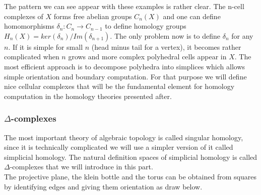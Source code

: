 \documentclass[12pt, a4paper]{article}
\begin{document}
The pattern we can see appear with these examples is rather clear. The n-cell complexes of $X$ forms free abelian groups $C_n(X)$ and one can define homomorphisms $\delta_n: C_n \to C_{n-1}$ to define homology groups $H_n(X) = ker(\delta_n)/Im(\delta_{n+1})$. The only problem now is to define $\delta_n$ for any $n$. If it is simple for small $n$ (head minus tail for a vertex), it becomes rather complicated when $n$ grows and more complex polyhedral cells appear in $X$. The most efficient approach is to decompose polyhedra into simplices which allows simple orientation and boundary computation. For that purpose we will define nice cellular complexes that will be the fundamental element for homology computation in the homology theories presented after. 

\subsubsection{$\Delta$-complexes}
\label{sec:delta_complexes}

The most important theory of algebraic topology is called singular homology, since it is technically complicated we will use a simpler version of it called simplicial homology. The natural definition spaces of simplicial homology is called $\Delta$-complexes that we will introduce in this part.\\

The projective plane, the klein bottle and the torus can be obtained from squares by identifying edges and giving them orientation as draw below.
\end{document}
